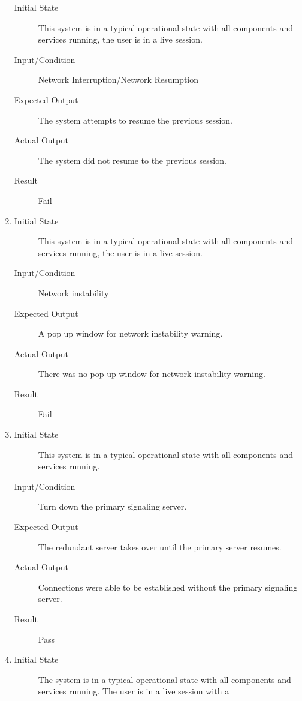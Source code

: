 \documentclass[12pt, titlepage]{article}
\begin{document}
\begin{enumerate}[NFR-T1]
    \begin{description}
    \item[Initial State] This system is in a typical operational state with all
      components and services running, the user is in a live session.
    \item[Input/Condition] Network Interruption/Network Resumption
    \item[Expected Output] The system attempts to resume the previous session.
    \item[Actual Output] The system did not resume to the previous session.
    \item[Result] Fail
    \end{description}
  \item \label{NFRT8}
    \begin{description}
    \item[Initial State] This system is in a typical operational state with all
      components and services running, the user is in a live session.
    \item[Input/Condition] Network instability
    \item[Expected Output] A pop up window for network instability warning.
    \item[Actual Output] There was no pop up window for network instability
      warning.
    \item[Result] Fail
    \end{description}
  \item \label{NFRT9}
    \begin{description}
    \item[Initial State] This system is in a typical operational state with all
      components and services running.
    \item[Input/Condition] Turn down the primary signaling server.
    \item[Expected Output] The redundant server takes over until the primary server
      resumes.
    \item[Actual Output] Connections were able to be established without the
      primary signaling server.
    \item[Result] Pass
    \end{description}
  \item \label{NFRT10}
    \begin{description}
    \item[Initial State] The system is in a typical operational state with all
      components and services running. The user is in a live session with a

\end{description}
\end{enumerate}
\end{document}
